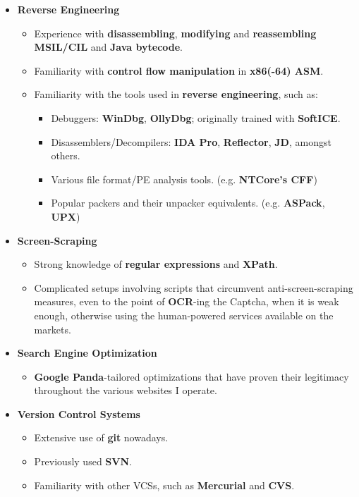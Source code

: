 \documentclass[12pt,a4paper]{article}
\begin{document}
\begin{itemize}
\begin{itemize}
\begin{itemize}
			\end{itemize}
		\item	\textbf{Reverse Engineering}
			\begin{itemize}
			\item	Experience with \textbf{disassembling}, \textbf{modifying} and \textbf{reassembling MSIL/CIL} and \textbf{Java bytecode}.
			\item	Familiarity with \textbf{control flow manipulation} in \textbf{x86(-64) ASM}.
			\item	Familiarity with the tools used in \textbf{reverse engineering}, such as:
				\begin{itemize}
				\item	Debuggers: \textbf{WinDbg}, \textbf{OllyDbg}; originally trained with \textbf{SoftICE}.
				\item	Disassemblers/Decompilers: \textbf{IDA Pro}, \textbf{Reflector}, \textbf{JD}, amongst others.
				\item	Various file format/PE analysis tools. (e.g. \textbf{NTCore's CFF})
				\item	Popular packers and their unpacker equivalents. (e.g. \textbf{ASPack}, \textbf{UPX})
				\end{itemize}
			\end{itemize}
		\item	\textbf{Screen-Scraping}
			\begin{itemize}
			\item	Strong knowledge of \textbf{regular expressions} and \textbf{XPath}.
			\item	Complicated setups involving scripts that circumvent anti-screen-scraping measures, even to the point of \textbf{OCR}-ing the Captcha, when it is weak enough, otherwise using the human-powered services available on the markets.
			\end{itemize}
		\item	\textbf{Search Engine Optimization}
			\begin{itemize}
			\item	\textbf{Google Panda}-tailored optimizations that have proven their legitimacy throughout the various websites I operate.
			\end{itemize}
		\item	\textbf{Version Control Systems}
			\begin{itemize}
			\item	Extensive use of \textbf{git} nowadays.
			\item	Previously used \textbf{SVN}.
			\item	Familiarity with other VCSs, such as \textbf{Mercurial} and \textbf{CVS}.

\end{itemize}
\end{itemize}
\end{itemize}
\end{document}
